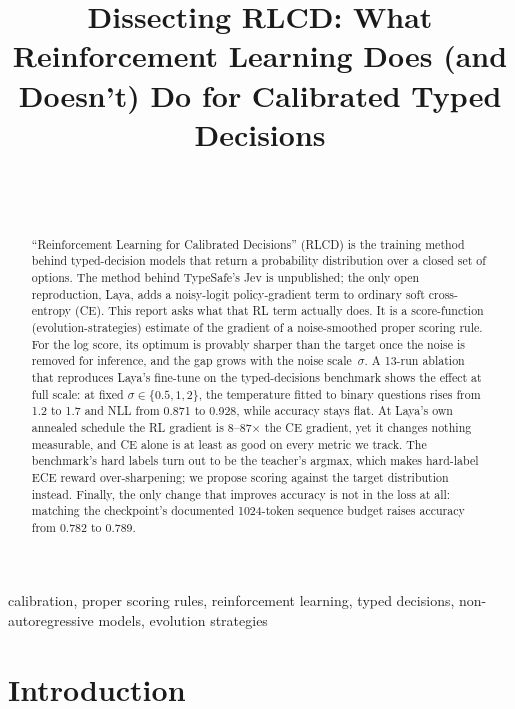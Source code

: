\documentclass[conference]{IEEEtran}
\begin{document}
\title{Dissecting RLCD: What Reinforcement Learning Does (and Doesn't) Do for Calibrated Typed Decisions}

\author{\\
\\
}

\maketitle

\begin{abstract}
``Reinforcement Learning for Calibrated Decisions'' (RLCD) is the training
method behind typed-decision models that return a probability distribution
over a closed set of options. The method behind TypeSafe's Jev is
unpublished; the only open reproduction, Laya, adds a noisy-logit
policy-gradient term to ordinary soft cross-entropy (CE). This report asks
what that RL term actually does. It is a score-function
(evolution-strategies) estimate of the gradient of a noise-smoothed proper
scoring rule. For the log score, its optimum is provably sharper than the
target once the noise is removed for inference, and the gap grows with the
noise scale~$\sigma$. A 13-run ablation that reproduces Laya's fine-tune on
the typed-decisions benchmark shows the effect at full scale: at fixed
$\sigma\in\{0.5,1,2\}$, the temperature fitted to binary questions rises from
1.2 to 1.7 and NLL from 0.871 to 0.928, while accuracy stays flat. At Laya's
own annealed schedule the RL gradient is 8--87$\times$ the CE gradient, yet it
changes nothing measurable, and CE alone is at least as good on every metric
we track. The benchmark's hard labels turn out to be the teacher's argmax,
which makes hard-label ECE reward over-sharpening; we propose scoring against
the target distribution instead. Finally, the only change that improves
accuracy is not in the loss at all: matching the checkpoint's documented
1024-token sequence budget raises accuracy from 0.782 to 0.789.
\end{abstract}

\begin{IEEEkeywords}
calibration, proper scoring rules, reinforcement learning, typed decisions,
non-autoregressive models, evolution strategies
\end{IEEEkeywords}

\section{Introduction}
\end{document}
